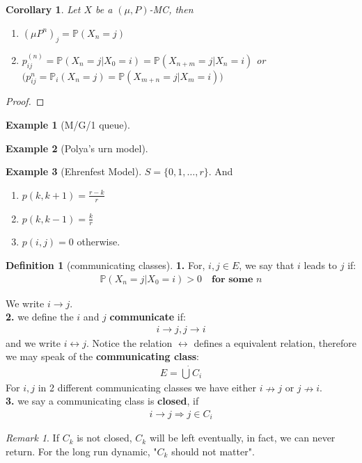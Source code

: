 \documentclass[a4paper,11pt]{book}
\newtheorem{corollary}{Corollary}[theorem]
\theoremstyle{definition}
\newtheorem{definition}{Definition}[section]
\newtheorem*{example}{Example}
\theoremstyle{remark}
\newtheorem*{remark}{Remark}
\begin{document}
\begin{corollary}
	Let $X$ be a $(\mu, P)$-MC, then
	\begin{enumerate}
		\item $(\mu P^n)_j = \mathbb{P}(X_n = j)$
		\item $p^{(n)}_{ij} = \mathbb{P}(X_n = j|X_0 = i) = \mathbb{P}(X_{n + m} = j|X_n = i)$ or $\bigg(p_{ij}^n = \mathbb{P}_i(X_n = j) = \mathbb{P}(X_{m+n} = j| X_m = i)\bigg)$
	\end{enumerate}
\end{corollary}
\begin{proof}
\end{proof}

\begin{example}[M/G/1 queue]
\end{example}

\begin{example}[Polya's urn model]
\end{example}

\begin{example}[Ehrenfest Model]
$S = \{0, 1, \dots, r\}$. And
\begin{enumerate}
	\item $p(k, k+1) = \frac{r-k}{r}$
	\item $p(k, k-1) = \frac{k}{r}$
	\item $p(i, j) = 0$ otherwise.
\end{enumerate}
\end{example}



\begin{definition}[communicating classes]
	\textbf{1.} For, $i, j \in E$, we say that $i$ leads to $j$ if:
	\begin{align*}
		\mathbb{P}(X_n = j| X_0 = i) > 0 \quad \textbf{for some $n$}
	\end{align*}

	We write $i \rightarrow j$. \\
	\textbf{2. }we define the $i$ and $j$ \textbf{communicate} if:
	\begin{align*}
		i \rightarrow j, j \rightarrow i
	\end{align*}
	and we write $i \leftrightarrow j$. Notice the relation $\leftrightarrow$ defines a equivalent relation, therefore we may speak of the \textbf{communicating class}: 
	\begin{align*}
		E = \dot{\bigcup} C_i
	\end{align*}
	For $i, j$ in 2 different communicating classes we have either $i \nrightarrow j$ or $j \nrightarrow i$. \\
	\textbf{3.} we say a communicating class is \textbf{closed}, if 
	\begin{align*}
		i \rightarrow j \Rightarrow j \in C_i
	\end{align*}
\end{definition}
\begin{remark}
If $C_k$ is not closed, $C_k$ will be left eventually, in fact, we can never return. For the long run dynamic, "$C_k$ should not matter".
\end{remark}
\end{document}
